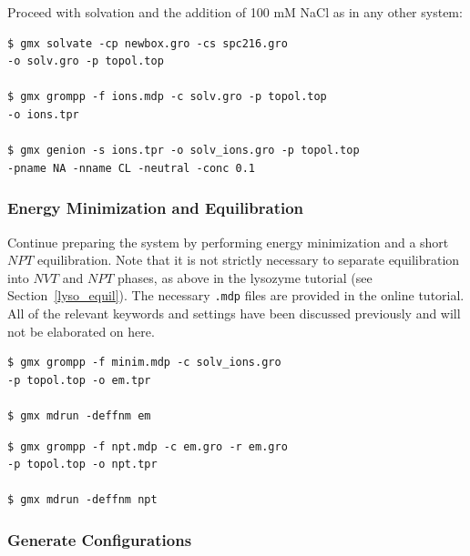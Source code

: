 \documentclass[9pt,tutorial]{livecoms}
\begin{document}
Proceed with solvation and the addition of 100 mM NaCl as in any other system:

\begin{verbatim}
$ gmx solvate -cp newbox.gro -cs spc216.gro
-o solv.gro -p topol.top

$ gmx grompp -f ions.mdp -c solv.gro -p topol.top
-o ions.tpr

$ gmx genion -s ions.tpr -o solv_ions.gro -p topol.top
-pname NA -nname CL -neutral -conc 0.1
\end{verbatim}

\subsubsection{Energy Minimization and Equilibration} \label{umbrella_equil}

Continue preparing the system by performing energy minimization and a short $NPT$ equilibration. Note that it is not strictly necessary to separate equilibration into $NVT$ and $NPT$ phases, as above in the lysozyme tutorial (see Section~\ref{lyso_equil}). The necessary \texttt{.mdp} files are provided in the online tutorial. All of the relevant keywords and settings have been discussed previously and will not be elaborated on here.

\begin{verbatim}
$ gmx grompp -f minim.mdp -c solv_ions.gro
-p topol.top -o em.tpr

$ gmx mdrun -deffnm em
\end{verbatim}

\begin{verbatim}
$ gmx grompp -f npt.mdp -c em.gro -r em.gro
-p topol.top -o npt.tpr

$ gmx mdrun -deffnm npt
\end{verbatim}

\subsubsection{Generate Configurations} \label{umbrella_smd}
\end{document}
